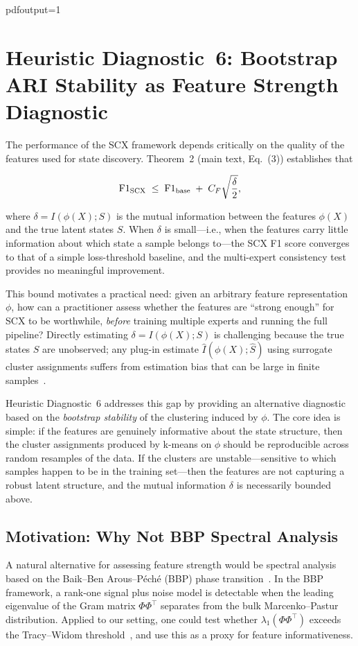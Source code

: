 pdfoutput=1
\section{Heuristic Diagnostic~6: Bootstrap ARI Stability as Feature Strength Diagnostic}
\label{sec:prop6}

The performance of the SCX framework depends critically on the quality of the features used for state discovery. Theorem~2 (main text, Eq.~(3)) establishes that

\[
\mathrm{F1}_{\mathrm{SCX}} \;\leq\; \mathrm{F1}_{\mathrm{base}} \;+\; C_F\sqrt{\frac{\delta}{2}},
\]

where $\delta = I(\phi(X); S)$ is the mutual information between the features $\phi(X)$ and the true latent states $S$. When $\delta$ is small---i.e., when the features carry little information about which state a sample belongs to---the SCX F1 score converges to that of a simple loss-threshold baseline, and the multi-expert consistency test provides no meaningful improvement.

This bound motivates a practical need: given an arbitrary feature representation $\phi$, how can a practitioner assess whether the features are ``strong enough'' for SCX to be worthwhile, \emph{before} training multiple experts and running the full pipeline? Directly estimating $\delta = I(\phi(X); S)$ is challenging because the true states $S$ are unobserved; any plug-in estimate $\hat{I}(\phi(X); \hat{S})$ using surrogate cluster assignments suffers from estimation bias that can be large in finite samples~\cite{paninski2003estimation, gao2017efficient}.

Heuristic Diagnostic~6 addresses this gap by providing an alternative diagnostic based on the \emph{bootstrap stability} of the clustering induced by $\phi$. The core idea is simple: if the features are genuinely informative about the state structure, then the cluster assignments produced by k-means on $\phi$ should be reproducible across random resamples of the data. If the clusters are unstable---sensitive to which samples happen to be in the training set---then the features are not capturing a robust latent structure, and the mutual information $\delta$ is necessarily bounded above.

\subsection{Motivation: Why Not BBP Spectral Analysis}

A natural alternative for assessing feature strength would be spectral analysis based on the Baik--Ben Arous--P\'ech\'e (BBP) phase transition~\cite{bbp2005phase, johnstone2001distribution}. In the BBP framework, a rank-one signal plus noise model is detectable when the leading eigenvalue of the Gram matrix $\Phi\Phi^\top$ separates from the bulk Marcenko--Pastur distribution. Applied to our setting, one could test whether $\lambda_1(\Phi\Phi^\top)$ exceeds the Tracy--Widom threshold~\cite{johnstone2001distribution}, and use this as a proxy for feature informativeness.

